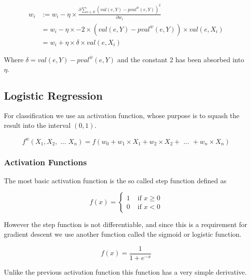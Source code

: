 \begin{align}
w_i &:= w_i - \eta \times \frac{\partial \sum_{e \in E}(val(e,Y) - pval^{\overline{w}}(e,Y))^2}{\partial w_i} \\
&= w_i - \eta \times -2 \times (val(e,Y) - pval^{\overline{w}}(e,Y)) \times val(e,X_i) \\
&= w_i + \eta \times \delta \times val(e,X_i)
\end{align}

Where $\delta = val(e,Y) - pval^{\overline{w}}(e,Y)$ and the constant 2 has been absorbed into $\eta$.

\begin{flushright}
\cite[p. 305]{AI2010}
\end{flushright}

\subsection{Logistic Regression}

For classification we use an activation function, whose purpose is to squash the result into the interval $(0,1)$.

$$f^{\overline{w}}(X_1, X_2, \text{ ... } X_n) = f(w_0 + w_1 \times X_1 + w_2 \times X_2 + \text{ ... } + w_n \times X_n)$$

\subsubsection{Activation Functions}

The most basic activation function is the so called step function defined as 

$$f(x) = \begin{cases}

	1 &\text{ if } x \geq 0 \\
	0 &\text{ if } x < 0 
\end{cases}$$

However the step function is not differentiable, and since this is a requirement for gradient descent we use another
function called the sigmoid or logistic function.

$$f(x) = \frac{1}{1+e^{-x}}$$

Unlike the previous activation function this function has a very simple derivative.

